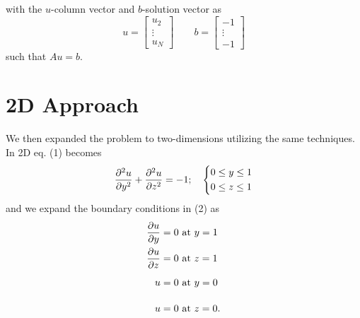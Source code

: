 \documentclass[11pt]{article}
\newcommand{\pd}[2]{\frac{\partial #1}{\partial #2}}
\begin{document}
	with the $ u $-column vector and $ b $-solution vector as
	\begin{equation}
		u = \begin{bmatrix}
		u_2\\
		\vdots\\
		u_N
		\end{bmatrix} \qquad b = \begin{bmatrix}
		-1\\\vdots\\-1
		\end{bmatrix}
	\end{equation}
	such that $ Au = b $.
	\section{2D Approach}
	We then expanded the problem to two-dimensions utilizing the same techniques. In 2D eq. (1) becomes
	\begin{equation}
		\pd{^2u}{y^2} + \pd{^2u}{z^2} = -1; \quad \begin{dcases}
		0\leq y\leq 1\\
		0\leq z\leq 1
		\end{dcases}
	\end{equation}
	and we expand the boundary conditions in (2) as
	\begin{align}
		\pd{u}{y} = 0&\text{ at }y=1\\
		\pd{u}{z} = 0&\text{ at }z=1\\
		u = 0&\text{ at }y=0\vphantom{\pd{u}{y}}\\
		u = 0&\text{ at }z=0\vphantom{\pd{u}{y}}.
	\end{align}
\end{document}
